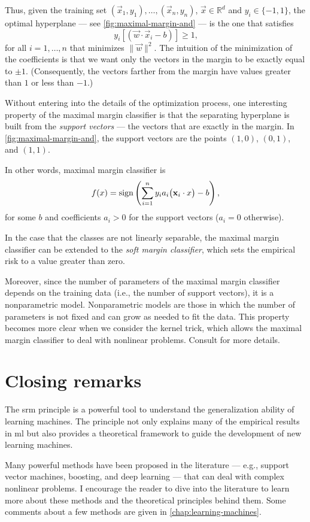 Thus, given the training set $(\vec{x}_1, y_1), \dots, (\vec{x}_n, y_n)$, $\vec{x} \in
\mathbb{R}^d$ and $y_i \in \{-1, 1\}$, the optimal hyperplane --- see
\cref{fig:maximal-margin-and} --- is the one that satisfies
\[
  y_i \left[(\vec{w} \cdot \vec{x}_i - b)\right] \geq 1\text{,}
\]
for all $i = 1, \dots, n$ that minimizes $\|\vec{w}\|^2$.  The intuition of the
minimization of the coefficients is that we want only the vectors in the margin to be
exactly equal to $\pm 1$.  (Consequently, the vectors farther from the margin have values
greater than $1$ or less than $-1$.)

Without entering into the details of the optimization process, one interesting property of
the maximal margin classifier is that the separating hyperplane is built from the \emph{support vectors}
--- the vectors that are exactly in the margin.  In \cref{fig:maximal-margin-and}, the
support vectors are the points $(1, 0)$, $(0, 1)$, and $(1, 1)$.

In other words, maximal margin classifier is
\[
  f(x) = \operatorname{sign}\left(\sum_{i=1}^{n} y_i a_i \big(\mathbf{x}_i \cdot x\big) - b\right)\text{,}
\]
for some $b$ and coefficients $a_i > 0$ for the support vectors ($a_i = 0$ otherwise).

In the case that the classes are not linearly separable, the maximal margin classifier can
be extended to the \emph{soft margin classifier}, which sets the empirical risk to a value
greater than zero.

Moreover, since the number of parameters of the maximal margin classifier depends on the
training data (i.e., the number of support vectors), it is a nonparametric model.
Nonparametric models are those in which the number of parameters is not fixed and can grow
as needed to fit the data.  This property becomes more clear when we consider the kernel
trick, which allows the maximal margin classifier to deal with nonlinear problems.
Consult \textcite{Vapnik1999b} for more details.

\section{Closing remarks}

The \gls{srm} principle is a powerful tool to understand the generalization ability of
learning machines.  The principle not only explains many of the empirical results in
\gls{ml} but also provides a theoretical framework to guide the development of new
learning machines.

Many powerful methods have been proposed in the literature --- e.g., support vector
machines, boosting, and deep learning --- that can deal with complex nonlinear problems.
I encourage the reader to dive into the literature to learn more about these methods and
the theoretical principles behind them.  Some comments about a few methods are given in
\cref{chap:learning-machines}.


